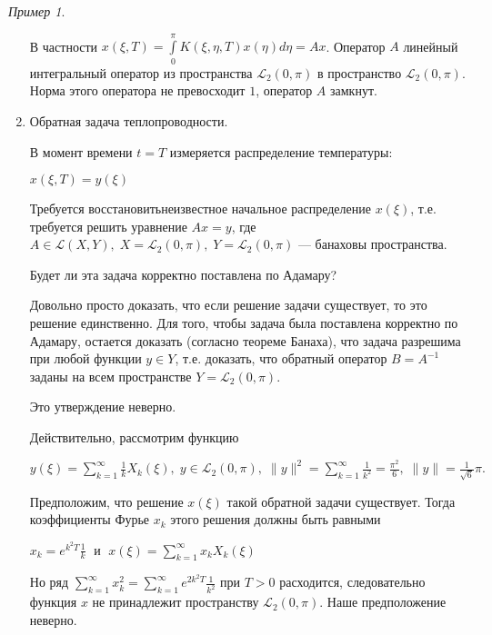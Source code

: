\documentclass[12pt,a4paper,titlepage,oneside]{book}
\theoremstyle{definition}
\theoremstyle{plain}
\theoremstyle{remark}
\theoremstyle{remark}
\newtheorem*{example}{Пример}
\theoremstyle{remark}
\theoremstyle{remark}
\theoremstyle{plain}
\theoremstyle{plain}
\begin{document}
\begin{example}
\begin{enumerate}
В частности $x(\xi,T) = \displaystyle\int\limits_0^\pi K(\xi, \eta, T) x(\eta)d\eta = Ax$. Оператор $A$ линейный интегральный оператор из пространства $\mathcal{L}_2(0, \pi)$ в пространство $\mathcal{L}_2(0, \pi)$. Норма этого оператора не превосходит $1$, оператор $A$ замкнут.

	\item Обратная задача теплопроводности.

В момент времени $t = T$ измеряется  распределение температуры:
\begin{center}
$x(\xi, T) = y(\xi)$
\end{center}

Требуется \guillemotleft восстановить\guillemotright \;неизвестное начальное распределение $x(\xi)$, т.е. требуется решить уравнение $Ax = y$, где $A \in \mathcal{L}(X,Y), \; X = \mathcal{L}_{2}(0, \pi), \; Y = \mathcal{L}_{2}(0, \pi)$ --- банаховы пространства.

Будет ли эта задача корректно поставлена по Адамару?

Довольно просто доказать, что если решение задачи существует, то это решение единственно. Для того, чтобы задача была поставлена корректно по Адамару, остается доказать (согласно теореме Банаха), что задача разрешима при любой функции $y \in Y$, т.е. доказать, что обратный оператор $B = A^{-1}$ заданы на всем пространстве $Y = \mathcal{L}_{2}(0, \pi)$.

Это утверждение неверно.

Действительно, рассмотрим функцию
\begin{center}
$y(\xi)=\displaystyle\sum\limits_{k=1}^{\infty} \frac{1}{k} X_k(\xi) ,  \; y\in \mathcal{L}_{2}(0, \pi), \; \|y\|^2 = \sum\limits_{k=1}^{\infty} \frac{1}{k^2} = \frac{\pi^2}{6} ,  \; \|y\| = \frac{1}{\sqrt{6}}\pi \mbox{.}$
\end{center}

Предположим, что решение $x(\xi)$ такой обратной задачи существует. Тогда коэффициенты Фурье $x_k$ этого решения должны быть равными
\begin{center}
$x_k=e^{k^2 T} \frac{1}{k} \; \mbox{ и } \; x(\xi) = \displaystyle\sum\limits_{k=1}^{\infty} x_k X_k(\xi)$
\end{center}

Но ряд $\displaystyle\sum\limits_{k=1}^{\infty} x_k^2 = \sum\limits_{k=1}^{\infty} e^{2k^2 T} \frac{1}{k^2}$ при $T > 0$ расходится, следовательно функция $x$ не принадлежит пространству $\mathcal{L}_2(0,\pi)$. Наше предположение неверно.


\end{enumerate}
\end{example}
\end{document}
